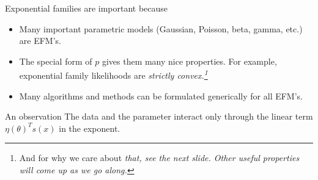 \documentclass[10pt]{beamer}
\begin{document}
\begin{frame}
\begin{sblock}{Exponential families are important because}
\begin{itemize}
\item Many important parametric models (Gaussian, Poisson, beta, gamma, etc.) are EFM's.
\item The special form of $p$ gives them many nice properties. For example, exponential family likelihoods are \it{strictly convex.}\footnote{And for why we care about \it{that}, see the next slide. Other useful properties will come up as we go along.}
\item Many algorithms and methods can be formulated generically for all EFM's. 
\end{itemize}
\end{sblock}
\vfill
\begin{sblock}{An observation}
The data and the parameter interact only through the linear term $\eta(\theta)^T s(x)$ in the exponent.
\end{sblock}

%
%
\end{frame}
\end{document}
